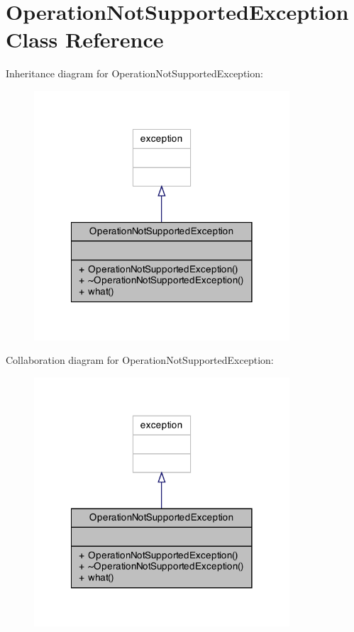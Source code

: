 \hypertarget{class_operation_not_supported_exception}{\section{Operation\+Not\+Supported\+Exception Class Reference}
\label{class_operation_not_supported_exception}
}


Inheritance diagram for Operation\+Not\+Supported\+Exception\+:\nopagebreak
\begin{figure}[H]
\begin{center}
\leavevmode
\includegraphics[width=270pt]{class_operation_not_supported_exception__inherit__graph}
\end{center}
\end{figure}


Collaboration diagram for Operation\+Not\+Supported\+Exception\+:\nopagebreak
\begin{figure}[H]
\begin{center}
\leavevmode
\includegraphics[width=270pt]{class_operation_not_supported_exception__coll__graph}
\end{center}
\end{figure}

